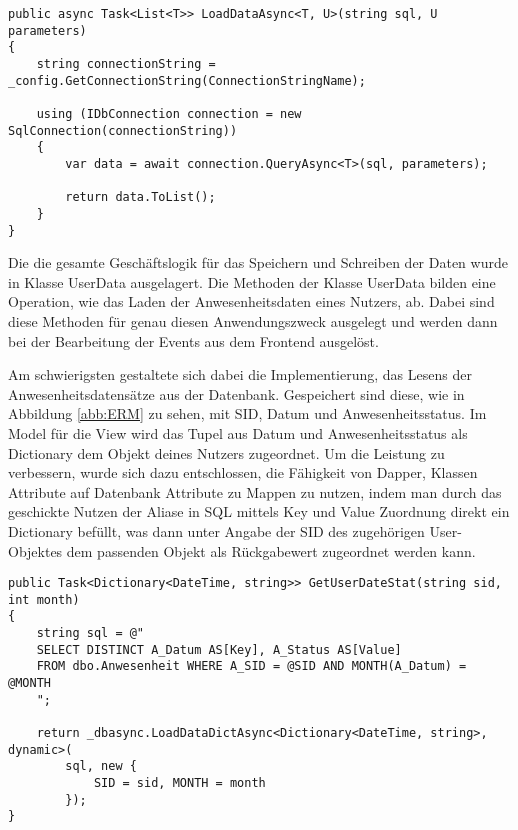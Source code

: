\begin{lstlisting}[frame=single,caption={Die Methode {\normalfont \ttfamily  LoadDataAsync} aus der SQLDataAccessAsync Klasse}, label={lst:LoadDataAsync}]
public async Task<List<T>> LoadDataAsync<T, U>(string sql, U parameters)
{
    string connectionString = _config.GetConnectionString(ConnectionStringName);

    using (IDbConnection connection = new SqlConnection(connectionString))
    {
        var data = await connection.QueryAsync<T>(sql, parameters);

        return data.ToList();
    }
}
\end{lstlisting}

Die die gesamte Geschäftslogik für das Speichern und Schreiben der Daten wurde in Klasse UserData ausgelagert. Die Methoden der Klasse UserData bilden eine Operation, wie \zB das Laden der Anwesenheitsdaten eines Nutzers, ab. Dabei sind diese Methoden für genau diesen Anwendungszweck ausgelegt und werden dann bei der Bearbeitung der Events aus dem Frontend ausgelöst.

Am schwierigsten gestaltete sich dabei die Implementierung, das Lesens der Anwesenheitsdatensätze aus der Datenbank. Gespeichert sind diese, wie in Abbildung \ref{abb:ERM} zu sehen, mit SID, Datum und Anwesenheitsstatus. Im Model für die View wird das Tupel aus Datum und Anwesenheitsstatus als Dictionary dem Objekt deines Nutzers zugeordnet. Um die Leistung zu verbessern, wurde sich dazu entschlossen, die Fähigkeit von Dapper, Klassen Attribute auf Datenbank Attribute zu Mappen zu nutzen, indem man durch das geschickte Nutzen der Aliase in SQL mittels Key und Value Zuordnung direkt ein Dictionary befüllt, was dann unter Angabe der SID des zugehörigen User-Objektes dem passenden Objekt als Rückgabewert zugeordnet werden kann.
\\
\begin{lstlisting}[frame=single,caption={Die Methode {\normalfont \ttfamily  GetUserDateStat} aus der UserData Klasse}, label={lst:GetUserDateStat}]
public Task<Dictionary<DateTime, string>> GetUserDateStat(string sid, int month)
{
    string sql = @"
    SELECT DISTINCT A_Datum AS[Key], A_Status AS[Value]
    FROM dbo.Anwesenheit WHERE A_SID = @SID AND MONTH(A_Datum) = @MONTH
    ";

    return _dbasync.LoadDataDictAsync<Dictionary<DateTime, string>, dynamic>(
        sql, new {
            SID = sid, MONTH = month
        });
}
\end{lstlisting}

